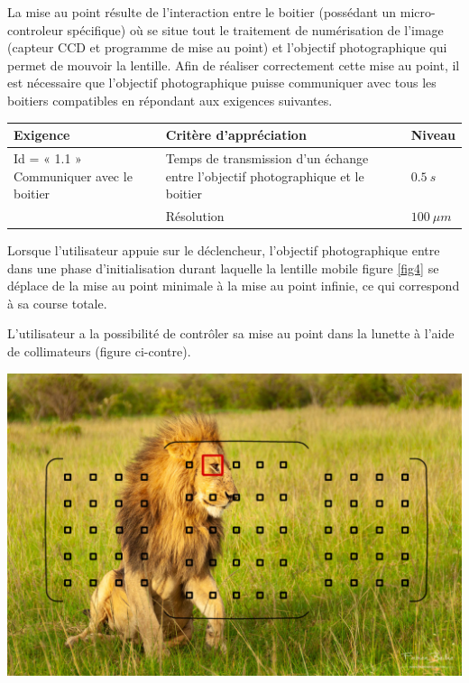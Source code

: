 La mise au point résulte de l'interaction entre le boitier (possédant un micro-controleur spécifique) où se situe
tout le traitement de numérisation de l'image (capteur CCD et programme
de mise au point) et l'objectif photographique qui permet de mouvoir la
lentille. Afin de réaliser correctement cette mise au point, il est
nécessaire que l'objectif photographique puisse communiquer avec tous
les boitiers compatibles en répondant aux exigences suivantes.

\begin{center}
\begin{tabular}{|p{}|p{}|p{}|}
\hline 
\textbf{Exigence} & \textbf{Critère d'appréciation} & \textbf{Niveau} \\ 
\hline 
Id = « 1.1 » Communiquer avec le boitier & Temps de transmission d'un échange entre l'objectif photographique et le boitier & $\SI{0,5}{s}$ \\ 
\cline{2-3}
& Résolution & $\SI{100}{\mu m}$ \\ 
\hline 
\end{tabular} 
\end{center}


\noindent\begin{minipage}{0.55\textwidth}
Lorsque l'utilisateur appuie sur le déclencheur, l'objectif
photographique entre dans une phase d'initialisation durant laquelle la
lentille mobile figure \ref{fig4} se déplace de
la mise au point minimale à la mise au point infinie, ce qui correspond
à sa course totale.

L'utilisateur a la possibilité de contrôler sa mise au point dans la lunette à l'aide de collimateurs (figure ci-contre).
\end{minipage}\hfill
\begin{minipage}{0.4\textwidth}
\begin{center}
\includegraphics[width=.9\textwidth]{images/collimateurs.jpg}
\end{center}
\end{minipage}

